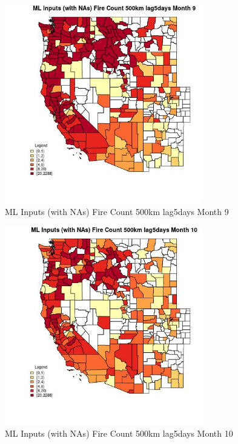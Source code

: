 \begin{figure} 
\centering  
\includegraphics[width=0.77\textwidth]{Code_Outputs/Report_ML_input_PM25_Step4_part_e_de_duplicated_aves_compiled_2019-05-20wNAs_CountyFire_Count_500km_lag5daysmedianMonth9.jpg} 
\caption{\label{fig:Report_ML_input_PM25_Step4_part_e_de_duplicated_aves_compiled_2019-05-20wNAsCountyFire_Count_500km_lag5daysmedianMonth9}ML Inputs (with NAs) Fire Count 500km lag5days Month 9} 
\end{figure} 
 

\begin{figure} 
\centering  
\includegraphics[width=0.77\textwidth]{Code_Outputs/Report_ML_input_PM25_Step4_part_e_de_duplicated_aves_compiled_2019-05-20wNAs_CountyFire_Count_500km_lag5daysmedianMonth10.jpg} 
\caption{\label{fig:Report_ML_input_PM25_Step4_part_e_de_duplicated_aves_compiled_2019-05-20wNAsCountyFire_Count_500km_lag5daysmedianMonth10}ML Inputs (with NAs) Fire Count 500km lag5days Month 10} 
\end{figure} 
 


